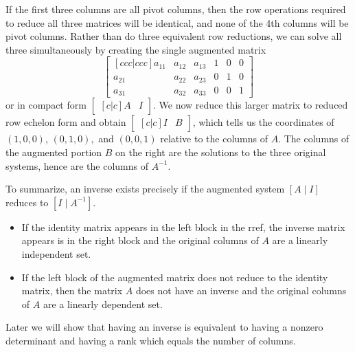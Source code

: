 If the first three columns are all pivot columns, then the row operations required to reduce all three matrices will be identical, and none of the 4th columns will be pivot columns.  Rather than do three equivalent row reductions, we can solve all three simultaneously by creating the single augmented matrix 
$$\begin{bmatrix}[ccc|ccc]
a_{11}&a_{12}&a_{13}&1&0&0\\ 
a_{21}&a_{22}&a_{23}&0&1&0\\ 
a_{31}&a_{32}&a_{33}&0&0&1 
\end{bmatrix} $$or in compact form $\begin{bmatrix}[c|c]A &I\end{bmatrix}$. We now reduce this larger matrix to reduced row echelon form and obtain $\begin{bmatrix}[c|c]I &B\end{bmatrix}$, which tells us the coordinates of $(1,0,0)$, $(0,1,0),$ and  $(0,0,1)$ relative to the columns of $A$. 
The columns of the augmented portion $B$ on the right are the solutions to the three original systems, hence are the columns of $A^{-1}$.

To summarize, an inverse exists precisely if the augmented system $[A\mid I]$ reduces to $[I\mid A^{-1}]$. 
\begin{itemize}
\item If the identity matrix appears in the left block in the rref, the inverse matrix appears is in the right block and the original columns of $A$ are a linearly independent set.
\item If the left block of the augmented matrix does not reduce to the identity matrix, then the matrix $A$ does not have an inverse and the original columns of $A$ are a linearly dependent set.
\end{itemize}
Later we will show that having an inverse is equivalent to having a nonzero determinant and having a rank which equals the number of columns.

